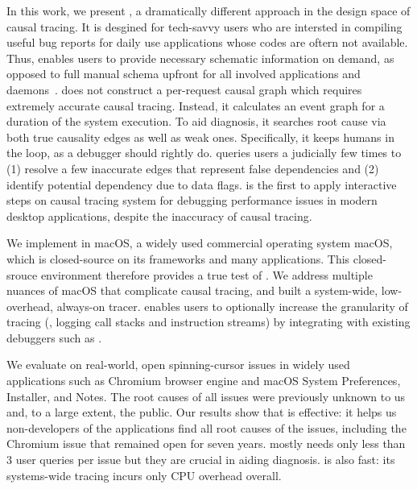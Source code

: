 In this work, we present \xxx, a dramatically different approach in the design
space of causal tracing. It is desgined for tech-savvy users who are intersted
in compiling useful bug reports for daily use applications whose codes are
oftern not available.  Thus, \xxx enables users to provide necessary schematic
information on demand, as opposed to full manual schema upfront for all
involved applications and daemons~\cite{barham2004using, reynolds2006pip,
fonseca2007x}. \xxx does not construct a per-request causal graph which
requires extremely accurate causal tracing. Instead, it calculates an event
graph for a duration of the system execution. To aid diagnosis, it searches
root cause via both true causality edges as well as weak ones.  Specifically,
it keeps humans in the loop, as a debugger should rightly do.  \xxx queries
users a judicially few times to (1) resolve a few inaccurate edges that
represent false dependencies and (2) identify potential dependency due to data
flags. \xxx is the first to apply interactive steps on causal tracing system
for debugging performance issues in modern desktop applications, despite the
inaccuracy of causal tracing.

We implement \xxx in macOS, a widely used commercial operating system macOS,
which is closed-source on its frameworks and many applications.  This
closed-srouce environment therefore provides a true test of \xxx. We address
multiple nuances of macOS that complicate causal tracing, and built a
system-wide, low-overhead, always-on tracer. \xxx enables users to optionally
increase the granularity of tracing (\eg, logging call stacks and instruction
streams) by integrating with existing debuggers such as .

We evaluate \xxx on \nbug real-world, open spinning-cursor issues in widely
used applications such as Chromium browser engine and macOS System Preferences,
Installer, and Notes. The root causes of all \nbug issues were previously
unknown to us and, to a large extent, the public. Our results show that \xxx is
effective: it helps us non-developers of the applications find all root causes
of the issues, including the Chromium issue that remained open for seven years.
\xxx mostly needs only less than 3 user queries per issue but they are crucial
in aiding diagnosis. \xxx is also fast: its systems-wide tracing incurs only
\cpuoverhead CPU overhead overall.


